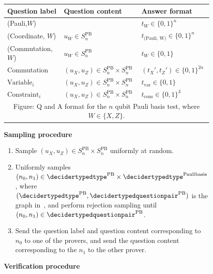 \begin{figure}[!htbp]
	\centering
	\begin{gamespec}
		\setlength{\tabcolsep}{1em}
		\begin{tabularx}{\textwidth}{ l   l   X   }
			\toprule
			Question label & Question content & Answer format \\
			\midrule
			(Pauli,$W$) &  & $ t_{W} \in \{0,1\}^n$ \\
			(Coordinate, $W$)& $u_W \in S^{\text{PB}}_n$& $ t_{\text{(Pauli, W)}} \in \{0,1\}^{n}$ \\
			(Commutation, $W$)& $u_W \in S^{\text{PB}}_n$& $t_W  \in \{0,1\}$ \\
			Commutation& $(u_X,u_Z)  \in S^{\text{PB}}_n \times S^{\text{PB}}_n$& $(t_{X}', t_{Z}') \in \{0,1\}^{2n}$ \\
			$\text{Variable}_i$& $(u_X,u_Z) \in S^{\text{PB}}_n \times S^{\text{PB}}_n$& $t_{\text{var}} \in \{0,1\}$ \\
			$\text{Constraint}_i$& $(u_X,u_Z)\in S^{\text{PB}}_n \times S^{\text{PB}}_n$& $t_{\text{cons}} \in \{0,1\}^{3}$ \\
			\bottomrule
			\multicolumn{3}{c}{Figure: Q and A format for the $n$ qubit Pauli basis test, where $W\in \{X,Z\}$. }
		\end{tabularx}
		\begin{center}
			\textbf{Sampling procedure}
		\end{center}
		\begin{enumerate}
			\item Sample $(u_X,u_Z) \in S^{\text{PB}}_n \times S^{\text{PB}}_n$ uniformly at random. 
			\item Uniformly samples $(n_0, n_1) \in \decidertypedtype^{\text{PB}} \times \decidertypedtype^{\text{Paulibasis}}$, where $(\decidertypedtype^{\text{PB}},  \decidertypedquestionpair^{\text{PB}})$ is the graph in~, and perform rejection sampling until $(n_0, n_1) \in \decidertypedquestionpair^{\text{PB}}$. 
			\item Send the question label and question content corresponding to $n_0$ to one of the provers, and send the question content corresponding to the $n_1$ to the other prover.
		\end{enumerate}
		\begin{center}
			\textbf{Verification procedure}
			

\end{center}
\end{gamespec}
\end{figure}
